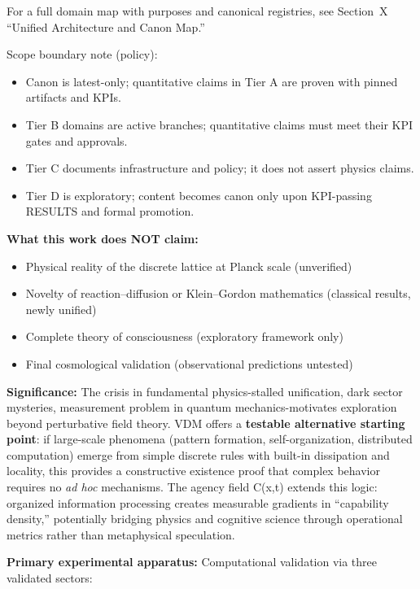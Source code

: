 \documentclass[
]{article}
\providecommand{\tightlist}{%
  \setlength{\itemsep}{0pt}\setlength{\parskip}{0pt}}
\begin{document}
For a full domain map with purposes and canonical registries, see Section~X
``Unified Architecture and Canon Map.''

Scope boundary note (policy):

\begin{itemize}
\tightlist
\item
  Canon is latest-only; quantitative claims in Tier A are proven with
  pinned artifacts and KPIs.
\item
  Tier B domains are active branches; quantitative claims must meet
  their KPI gates and approvals.
\item
  Tier C documents infrastructure and policy; it does not assert physics
  claims.
\item
  Tier D is exploratory; content becomes canon only upon KPI-passing
  RESULTS and formal promotion.
\end{itemize}

\textbf{What this work does NOT claim:}

\begin{itemize}
\tightlist
\item
  Physical reality of the discrete lattice at Planck scale (unverified)
\item
  Novelty of reaction--diffusion or Klein--Gordon mathematics (classical
  results, newly unified)
\item
  Complete theory of consciousness (exploratory framework only)
\item
  Final cosmological validation (observational predictions untested)
\end{itemize}

\textbf{Significance:} The crisis in fundamental physics-stalled
unification, dark sector mysteries, measurement problem in quantum
mechanics-motivates exploration beyond perturbative field theory. VDM
offers a \textbf{testable alternative starting point}: if large-scale
phenomena (pattern formation, self-organization, distributed
computation) emerge from simple discrete rules with built-in dissipation
and locality, this provides a constructive existence proof that complex
behavior requires no \emph{ad hoc} mechanisms. The agency field C(x,t)
extends this logic: organized information processing creates measurable
gradients in ``capability density,'' potentially bridging physics and
cognitive science through operational metrics rather than metaphysical
speculation.

\textbf{Primary experimental apparatus:} Computational validation via
three validated sectors:
\end{document}
